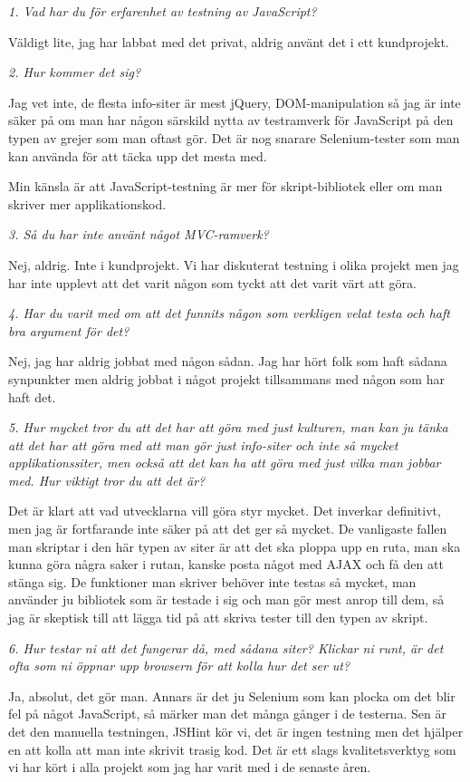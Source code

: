 \documentclass[11pt]{article}
\begin{document}
\emph{1. Vad har du för erfarenhet av testning av JavaScript?}

Väldigt lite, jag har labbat med det privat, aldrig använt det i ett kundprojekt.

\emph{2. Hur kommer det sig?}

Jag vet inte, de flesta info-siter är mest jQuery, DOM-manipulation så jag är inte säker på om man har någon särskild nytta av testramverk för JavaScript på den typen av grejer som man oftast gör. Det är nog snarare Selenium-tester som man kan använda för att täcka upp det mesta med.

Min känsla är att JavaScript-testning är mer för skript-bibliotek eller om man skriver mer applikationskod.

\emph{3. Så du har inte använt något MVC-ramverk?}

Nej, aldrig. Inte i kundprojekt. Vi har diskuterat testning i olika projekt men jag har inte upplevt att det varit någon som tyckt att det varit värt att göra.

\emph{4. Har du varit med om att det funnits någon som verkligen velat testa och haft bra argument för det?}

Nej, jag har aldrig jobbat med någon sådan. Jag har hört folk som haft sådana synpunkter men aldrig jobbat i något projekt tillsammans med någon som har haft det.

\emph{5. Hur mycket tror du att det har att göra med just kulturen, man kan ju tänka att det har att göra med att man gör just info-siter och inte så mycket applikationssiter, men också att det kan ha att göra med just vilka man jobbar med. Hur viktigt tror du att det är?}

Det är klart att vad utvecklarna vill göra styr mycket. Det inverkar definitivt, men jag är fortfarande inte säker på att det ger så mycket. De vanligaste fallen man skriptar i den här typen av siter är att det ska ploppa upp en ruta, man ska kunna göra några saker i rutan, kanske posta något med AJAX och få den att stänga sig. De funktioner man skriver behöver inte testas så mycket, man använder ju bibliotek som är testade i sig och man gör mest anrop till dem, så jag är skeptisk till att lägga tid på att skriva tester till den typen av skript.

\emph{6. Hur testar ni att det fungerar då, med sådana siter? Klickar ni runt, är det ofta som ni öppnar upp browsern för att kolla hur det ser ut?}

Ja, absolut, det gör man. Annars är det ju Selenium som kan plocka om det blir fel på något JavaScript, så märker man det många gånger i de testerna. Sen är det den manuella testningen, JSHint kör vi, det är ingen testning men det hjälper en att kolla att man inte skrivit trasig kod. Det är ett slags kvalitetsverktyg som vi har kört i alla projekt som jag har varit med i de senaste åren.
\end{document}
